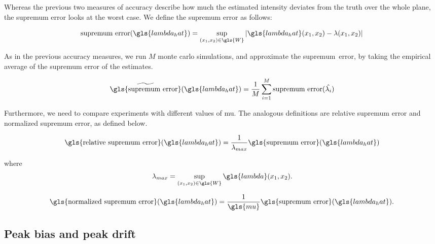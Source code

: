 Whereas the previous two measures of accuracy describe how much the estimated intensity deviates from the truth over the whole plane,
the \gls{supremum error} looks at the worst case.
We define the \gls{supremum error} as follows:

\begin{equation}
    \mbox{supremum error}(\gls{lambda_hat}) = \sup_{(x_1, x_2) \in \gls{W}}
        {\left|
            \gls{lambda_hat}(x_1, x_2) - \lambda(x_1, x_2)
        \right|}
\end{equation}

As in the previous accuracy measures, we run \(M\) monte carlo simulations, and approximate the \mbox{supremum error}, by taking the empirical average of the supremum error of the estimates.

\begin{equation}
    \widetilde{\mbox{\gls{supremum error}}}(\gls{lambda_hat}) = \frac{1}{M} \sum_{i=1}^{M} \mbox{supremum error}(\hat{\lambda_i})
\end{equation}

Furthermore, we need to compare experiments with different values of \gls{mu}.
The analogous definitions are \gls{relative supremum error} and \gls{normalized supremum error}, as defined below.

\begin{equation}
\label{eq:relative_supremum_error}
    \mbox{\gls{relative supremum error}}(\gls{lambda_hat}) = 
        \frac{1}{\lambda_{max}} \mbox{\gls{supremum error}}(\gls{lambda_hat}) \\
\end{equation}

where
\begin{equation}
\label{eq:lambda_max}
    \lambda_{max} = \sup_{(x_1, x_2) \in \gls{W}}{\gls{lambda}(x_1, x_2)} \text{.}
\end{equation}

\begin{equation}
\label{eq:normalized_supremum_error}
    \mbox{\gls{normalized supremum error}}(\gls{lambda_hat}) = 
        \frac{1}{\gls{mu}} \mbox{\gls{supremum error}}(\gls{lambda_hat}) \text{.}
\end{equation}

\subsection{Peak bias and peak drift}
\label{subsec:method:peak_bias}


